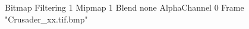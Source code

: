 {Bitmap
	{Filtering 1}
	{Mipmap 1}
	{Blend none}
	{AlphaChannel 0}
	{Frame "Crusader_xx.tif.bmp"}
}
